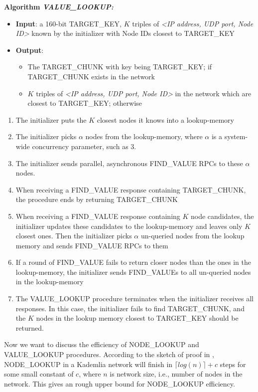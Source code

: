 \noindent \textbf{Algorithm \textit{VALUE\_LOOKUP:}}
\begin{itemize}
  \item \textbf{Input}: a 160-bit TARGET\_KEY, $K$ triples of \textit{<IP address, UDP port, Node ID>} known by the initializer with Node IDs closest to TARGET\_KEY
  \item \textbf{Output}:
  \begin{itemize}
    \item The TARGET\_CHUNK with key being TARGET\_KEY; if TARGET\_CHUNK exists in the network
    \item $K$ triples of \textit{<IP address, UDP port, Node ID>} in the network which are closest to TARGET\_KEY; otherwise
  \end{itemize}
\end{itemize}
\begin{enumerate}[label=(\roman*)]
  \item The initializer puts the $K$ closest nodes it knows into a lookup-memory
  \item The initializer picks $\alpha$ nodes from the lookup-memory, where $\alpha$ is a system-wide concurrency parameter, such as 3.
  \item The initializer sends parallel, asynchronous FIND\_VALUE RPCs to these $\alpha$ nodes.
  \item When receiving a FIND\_VALUE response containing TARGET\_CHUNK, the procedure ends by returning TARGET\_CHUNK
  \item When receiving a FIND\_VALUE response containing $K$ node candidates, the initializer updates these candidates to the lookup-memory and leaves only $K$ closest ones. Then the initializer picks $\alpha$ un-queried nodes from the lookup memory and sends FIND\_VALUE RPCs to them
  \item If a round of FIND\_VALUE fails to return closer nodes than the ones in the lookup-memory, the initializer sends FIND\_VALUEs to all un-queried nodes in the lookup-memory
  \item The VALUE\_LOOKUP procedure terminates when the initializer receives all responses. In this case, the initializer fails to find TARGET\_CHUNK, and the $K$ nodes in the lookup memory closest to TARGET\_KEY should be returned.
\end{enumerate}

Now we want to discuss the efficiency of NODE\_LOOKUP and VALUE\_LOOKUP procedures. According to the sketch of proof in \cite{maymounkov2002kademlia}, NODE\_LOOKUP in a Kademlia network will finish in $\lceil log(n) \rceil + c$ steps for some small constant of $c$, where $n$ is network size, i.e., number of nodes in the network. This gives an rough upper bound for NODE\_LOOKUP efficiency.


